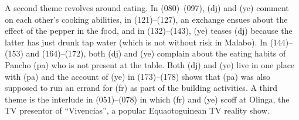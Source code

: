A second theme revolves around eating. In (080)–(097), (dj) and (ye) comment on each other’s cooking abilities, in (121)–(127), an exchange ensues about the effect of the pepper in the food, and in (132)–(143), (ye) teases (dj) because the latter has just drunk tap water (which is not without risk in Malabo). In (144)–(153) and (164)–(172), both (dj) and (ye) complain about the eating habits of Pancho (pa) who is not present at the table. Both (dj) and (ye) live in one place with (pa) and the account of (ye) in (173)–(178) shows that (pa) was also supposed to run an errand for (fr) as part of the building activities. A third theme is the interlude in (051)–(078) in which (fr) and (ye) scoff at Olinga, the TV presentor of “Vivencias”, a popular Equaotoguinean TV reality show.

\setcounter{equation}{0}  %

